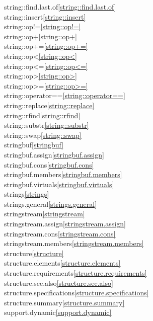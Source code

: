 \begin{multicols}{2}
string::find.last.of\quad\ref{string::find.last.of}\\
string::insert\quad\ref{string::insert}\\
string::op!=\quad\ref{string::op!=}\\
string::op+\quad\ref{string::op+}\\
string::op+=\quad\ref{string::op+=}\\
string::op<\quad\ref{string::op<}\\
string::op<=\quad\ref{string::op<=}\\
string::op>\quad\ref{string::op>}\\
string::op>=\quad\ref{string::op>=}\\
string::operator==\quad\ref{string::operator==}\\
string::replace\quad\ref{string::replace}\\
string::rfind\quad\ref{string::rfind}\\
string::substr\quad\ref{string::substr}\\
string::swap\quad\ref{string::swap}\\
stringbuf\quad\ref{stringbuf}\\
stringbuf.assign\quad\ref{stringbuf.assign}\\
stringbuf.cons\quad\ref{stringbuf.cons}\\
stringbuf.members\quad\ref{stringbuf.members}\\
stringbuf.virtuals\quad\ref{stringbuf.virtuals}\\
strings\quad\ref{strings}\\
strings.general\quad\ref{strings.general}\\
stringstream\quad\ref{stringstream}\\
stringstream.assign\quad\ref{stringstream.assign}\\
stringstream.cons\quad\ref{stringstream.cons}\\
stringstream.members\quad\ref{stringstream.members}\\
structure\quad\ref{structure}\\
structure.elements\quad\ref{structure.elements}\\
structure.requirements\quad\ref{structure.requirements}\\
structure.see.also\quad\ref{structure.see.also}\\
structure.specifications\quad\ref{structure.specifications}\\
structure.summary\quad\ref{structure.summary}\\
support.dynamic\quad\ref{support.dynamic}\\

\end{multicols}
